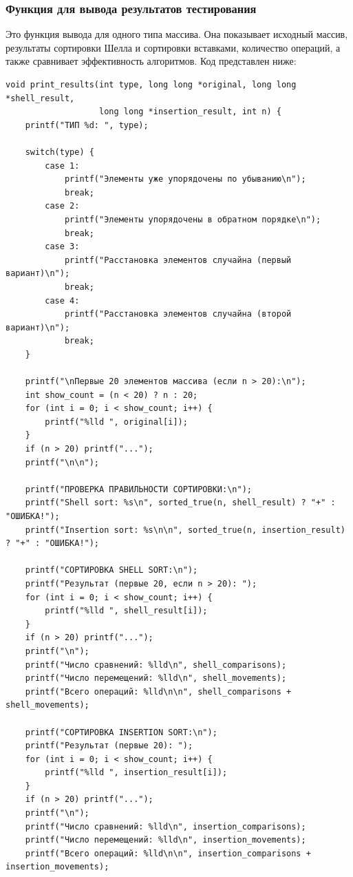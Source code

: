 \documentclass[a4paper,12pt,titlepage,finall]{article}
\begin{document}
\subsubsection{Функция для вывода результатов тестирования}
Это функция вывода для одного типа массива. Она показывает исходный массив, результаты сортировки Шелла и сортировки вставками, количество операций, а также сравнивает эффективность алгоритмов.
Код представлен ниже:

\begin{verbatim}
void print_results(int type, long long *original, long long *shell_result, 
                   long long *insertion_result, int n) {
    printf("ТИП %d: ", type);
    
    switch(type) {
        case 1:
            printf("Элементы уже упорядочены по убыванию\n");
            break;
        case 2:
            printf("Элементы упорядочены в обратном порядке\n");
            break;
        case 3:
            printf("Расстановка элементов случайна (первый вариант)\n");
            break;
        case 4:
            printf("Расстановка элементов случайна (второй вариант)\n");
            break;
    }
    
    printf("\nПервые 20 элементов массива (если n > 20):\n");
    int show_count = (n < 20) ? n : 20;
    for (int i = 0; i < show_count; i++) {
        printf("%lld ", original[i]);
    }
    if (n > 20) printf("...");
    printf("\n\n");

    printf("ПРОВЕРКА ПРАВИЛЬНОСТИ СОРТИРОВКИ:\n");
    printf("Shell sort: %s\n", sorted_true(n, shell_result) ? "+" : "ОШИБКА!");
    printf("Insertion sort: %s\n\n", sorted_true(n, insertion_result) ? "+" : "ОШИБКА!");
    
    printf("СОРТИРОВКА SHELL SORT:\n");
    printf("Результат (первые 20, если n > 20): ");
    for (int i = 0; i < show_count; i++) {
        printf("%lld ", shell_result[i]);
    }
    if (n > 20) printf("...");
    printf("\n");
    printf("Число сравнений: %lld\n", shell_comparisons);
    printf("Число перемещений: %lld\n", shell_movements);
    printf("Всего операций: %lld\n\n", shell_comparisons + shell_movements);
    
    printf("СОРТИРОВКА INSERTION SORT:\n");
    printf("Результат (первые 20): ");
    for (int i = 0; i < show_count; i++) {
        printf("%lld ", insertion_result[i]);
    }
    if (n > 20) printf("...");
    printf("\n");
    printf("Число сравнений: %lld\n", insertion_comparisons);
    printf("Число перемещений: %lld\n", insertion_movements);
    printf("Всего операций: %lld\n\n", insertion_comparisons + insertion_movements);


\end{verbatim}
\end{document}
